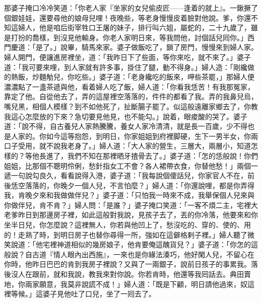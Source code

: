 那婆子掩口冷冷笑道：「你老人家『坐家的女兒偷皮匠——逢着的就上』。一鍬撅了個銀娃娃，還要尋他的娘母兒哩！夜晚些，等老身慢慢皮着臉對他說。爹，你還不知這婦人，他是咱后街宰牲口王屠的妹子，排行叫六姐，屬蛇的，二十九歲了，雖是打扮的喬樣，到沒見他輸身。{}你老人家明日來，等我問他，討個話兒囘你。」西門慶道：「是了。」說畢，騎馬來家。婆子做飯吃了，鎖了房門，慢慢來到婦人家。婦人開門，便讓進房裡坐，道：「我昨日下了些面，等你來吃，就不來了。」婆子道：「我可要來哩，到人家就有許多事，掛住了腿，動不得身。」婦人造：「剛纔做的熱飯，炒麵觔兒，你吃些。」{}婆子道：「老身纔吃的飯來，呷些茶罷，」那婦人便濃濃點了一盞茶遞與他，看着婦人吃了飯，婦人道：「你看我恁苦！有我那冤家，靠定了他。自從他去了，弄的這屋裡空落落的，件件的都看了我。弄的我鼻兒烏，嘴兒黑，相個人模樣？到不如他死了，扯斷腸子罷了。似這般遠離家鄉去了，你教我這心怎麼放的下來？急切要見他見，也不能勾。」{}說着，眼痠酸的哭了。婆子道：「說不得，自古養兒人家熱騰騰，養女人家冷清清，就是長一百歲，少不得也是人家的。你如今這等抱怨，到明日，你家姐姐到府裡脚硬，生下一男半女，你兩口子受用，就不說我老身了。」婦人道：「大人家的營生，三層大，兩層小，知道怎樣的？等他長進了，我們不知在那裡晒牙揸骨去了。」{}婆子道：「怎的恁般說！你們姐姐，比那個不聰明伶俐，愁針指女工不會？各人裙帶衣食，你替他愁！」兩個一遞一句說勾良久，看看說得入港，婆子道：「我每說個傻話兒，你家官人不在，前後恁空落落的，你晚夕一個人兒，不言怕麼？」婦人道：「你還說哩，都是你弄得我，肯晚夕來和我做做伴兒？」婆子道：「只怕我一時來不成，我舉保個人兒來與你做伴兒，肯不肯？」婦人問：「是誰？」婆子掩口笑道：「一客不煩二主，宅裡大老爹昨日到那邊房子裡，如此這般對我說，見孩子去了，丟的你冷落，他要來和你坐半日兒，你怎麼說？這裡無人，你若與他凹上了，愁沒吃的、穿的、使的、用的！走熟了時，到明日房子也替你尋得一所，強如在這僻格剌子裡。」婦人聽了微笑說道：「他宅裡神道相似的幾房娘子，他肯要俺這醜貨兒？」{}婆子道：「你怎的這般說？自古道『情人眼內出西施』，一來也是你緣法湊巧，他好閑人兒，不留心在你時，他昨日巴巴的肯到我房子裡說？又與了一兩銀子，說前日孩子的事累我。落後沒人在跟前，就和我說，教我來對你說。你若肯時，他還等我囘話去。典田賣地，你兩家願意，我莫非說謊不成！」婦人道：「既是下顧，明日請他過來，奴這裡等候。」這婆子見他吐了口兒，坐了一囘去了。

